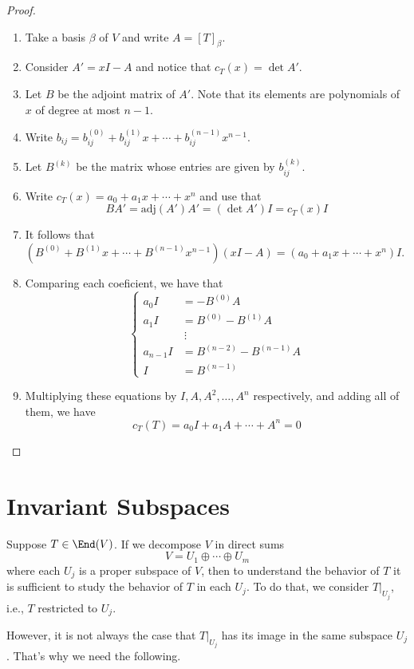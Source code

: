 \begin{proof}
	\begin{enumerate}
		\item Take a basis $\beta$ of $V$ and write $A = [T]_\beta$.
		\item Consider $A' = xI - A$ and notice that $c_T(x) = \det A'$.
		\item Let $B$ be the adjoint matrix of $A'$. Note that its elements are polynomials of $x$ of degree at most $n-1$.
		\item Write $b_{ij} = b_{ij}^{(0)} + b_{ij}^{(1)}x + \cdots + b_{ij}^{(n-1)}x^{n-1}$.
		\item Let $B^{(k)}$ be the matrix whose entries are given by $b_{ij}^{(k)}$.
		\item Write $c_T(x) = a_0 + a_1 x + \cdots + x^n$ and use that \[ B A' = \text{adj}(A') A' = (\det A') I = c_T(x) I \]
		\item It follows that $(B^{(0)} + B^{(1)} x + \cdots + B^{(n-1)} x^{n-1})(xI - A) = (a_0 + a_1 x + \cdots + x^n) I$.
		\item Comparing each coeficient, we have that
		\[
			\begin{cases}
				a_0 I &= -B^{(0)}A \\
				a_1 I &= B^{(0)} - B^{(1)}A \\
				&~\vdots \\
				a_{n-1} I &= B^{(n-2)} - B^{(n-1)}A \\
				I &= B^{(n-1)}
			\end{cases}
		\]
		\item Multiplying these equations by $I, A, A^2, \ldots, A^n$ respectively, and adding all of them, we have \[ c_T(T) = a_0 I + a_1 A + \cdots + A^n = 0 \]
	\end{enumerate}
\end{proof}

\section{Invariant Subspaces}\label{sec:inv_sub}

Suppose $T \in \End(V)$. If we decompose $V$ in direct sums
	\[
		V = U_1 \oplus \cdots \oplus U_m
	\]
where each $U_j$ is a proper subspace of $V$, then to understand the behavior of $T$ it is sufficient to study the behavior of $T$ in each $U_j$. To do that, we consider $T|_{U_j}$, i.e., $T$ restricted to $U_j$.

However, it is not always the case that $T|_{U_j}$ has its image in the same subspace ${U_j}$. That's why we need the following.

